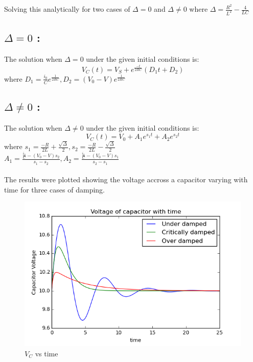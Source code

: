 \documentclass[12pt, a4paper]{report}
\begin{document}
Solving this analytically for two cases of $\Delta = 0$ and $\Delta \ne 0$ where $\Delta = \frac{R^2}{L^2} - \frac{4}{LC}$ \\
\subsection*{$\Delta = 0$ :}
The solution when $\Delta = 0$ under the given initial conditions is:
\begin{equation}
 V_C(t) = V_S + e^\frac{-t}{2RC}(D_1t + D_2)
\end{equation}
where $D_1 = \frac{i_0}{C}e^\frac{1}{2RC} , D_2 = (V_0 - V)e^\frac{1}{2RC}$
\subsection*{$\Delta \ne 0$ :}
The solution when $\Delta \ne 0$ under the given initial conditions is:
\begin{equation}
 V_C(t) = V_0 + A_1e^{s_1t} + A_2e^{s_2t}
\end{equation}
where $s_1 = \frac{-R}{2L} + \frac{\sqrt{\Delta}}{2} , s_2 = \frac{-R}{2L} - \frac{\sqrt{\Delta}}{2}$ \\
$A_1 = \frac{\frac{i_0}{C} - (V_0 - V)s_2}{s_1 - s_2} , A_2 = \frac{\frac{i_0}{C} - (V_0 - V)s_1}{s_2 - s_1}$ \\
\\

The results were plotted showing the voltage accross a capacitor varying with time for three cases of damping.
\begin{figure}[H]
 \centering
 \includegraphics[width = \textwidth]{../output/VC.png}
 \caption{$V_C$ vs time}
 \label{VC}
\end{figure}
\end{document}

